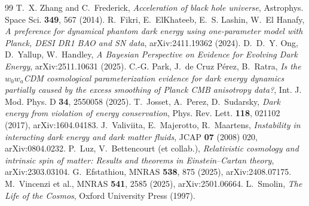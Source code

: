 \documentclass[11pt]{article}
\begin{document}
\begin{thebibliography}{99}
 T.~X. Zhang and C.~Frederick, \emph{Acceleration of black hole universe}, Astrophys. Space Sci. \textbf{349}, 567 (2014).
 R.~Fikri, E.~ElKhateeb, E.~S. Lashin, W.~El Hanafy, \emph{A preference for dynamical phantom dark energy using one-parameter model with Planck, DESI DR1 BAO and SN data}, arXiv:2411.19362 (2024).
 D.~D.~Y. Ong, D.~Yallup, W.~Handley, \emph{A Bayesian Perspective on Evidence for Evolving Dark Energy}, arXiv:2511.10631 (2025).
 C.-G. Park, J.~de Cruz P\'erez, B.~Ratra, \emph{Is the $w_0w_a$CDM cosmological parameterization evidence for dark energy dynamics partially caused by the excess smoothing of Planck CMB anisotropy data?}, Int. J. Mod. Phys. D \textbf{34}, 2550058 (2025).
 T.~Josset, A.~Perez, D.~Sudarsky, \emph{Dark energy from violation of energy conservation}, Phys. Rev. Lett. \textbf{118}, 021102 (2017), arXiv:1604.04183.
 J.~Valiviita, E.~Majerotto, R.~Maartens, \emph{Instability in interacting dark energy and dark matter fluids}, JCAP \textbf{07} (2008) 020, arXiv:0804.0232.
 P.~Luz, V.~Bettencourt (et collab.), \emph{Relativistic cosmology and intrinsic spin of matter: Results and theorems in Einstein--Cartan theory}, arXiv:2303.03104.
 G.~Efstathiou, MNRAS \textbf{538}, 875 (2025), arXiv:2408.07175.
 M.~Vincenzi et al., MNRAS \textbf{541}, 2585 (2025), arXiv:2501.06664.
 L.~Smolin, \emph{The Life of the Cosmos}, Oxford University Press (1997).
\end{thebibliography}
\end{document}
